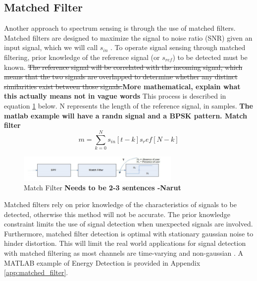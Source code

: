 \subsection{Matched Filter}
Another approach to spectrum sensing is through the use of matched filters. Matched filters are designed to maximize the signal to noise ratio (SNR) given an input signal, which we will call $s_{in}$ \cite{sensing_energy}. To operate signal sensing through matched filtering, prior knowledge of the reference signal (or $s_{ref}$) to be detected must be known. \sout{The reference signal will be correlated with the incoming signal, which means that the two signals are overlapped to determine whether any distinct similarities exist between those signals.}\textbf{More mathematical, explain what this actually means not in vague words} This process is described in equation \ref{fig:match_filter} below. N represents the length of the reference signal, in samples. 
\textbf{The matlab example will have a randn signal and a BPSK pattern. Match filter}
\[m = \sum_{k = 0}^{N}s_{in}[t-k]s_ref[N-k]\]
\begin{figure}[ht]
\centering
\includegraphics[width=0.70\textwidth]{img/match_filter.png}
\caption{Match Filter \textbf{Needs to be 2-3 sentences -Narut}}
\label{fig:match_filter}
\end{figure}\par
Matched filters rely on prior knowledge of the characteristics of signals to be detected, otherwise this method will not be accurate. The prior knowledge constraint limits the use of signal detection when unexpected signals are involved. Furthermore, matched filter detection is optimal with stationary gaussian noise to hinder distortion. This will limit the real world applications for signal detection with matched filtering as most channels are time-varying and non-gaussian \cite{channel_fade}. A MATLAB example of Energy Detection is provided in Appendix \ref{app:matched_filter}.

